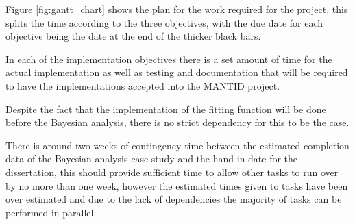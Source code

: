 \documentclass[a4paper,11pt]{article}
\begin{document}
Figure \ref{fig:gantt_chart} shows the plan for the work required for the
project, this splits the time according to the three objectives, with the due
date for each objective being the date at the end of the thicker black bars.

In each of the implementation objectives there is a set amount of time for the
actual implementation as well as testing and documentation that will be required
to have the implementations accepted into the \gls*{MANTID} project.

Despite the fact that the implementation of the fitting function will be done
before the Bayesian analysis, there is no strict dependency for this to be the
case.

There is around two weeks of contingency time between the estimated completion
data of the Bayesian analysis case study and the hand in date for the
dissertation, this should provide sufficient time to allow other tasks to run
over by no more than one week, however the estimated times given to tasks have
been over estimated and due to the lack of dependencies the majority of tasks
can be performed in parallel.

\printbibliography
\end{document}
